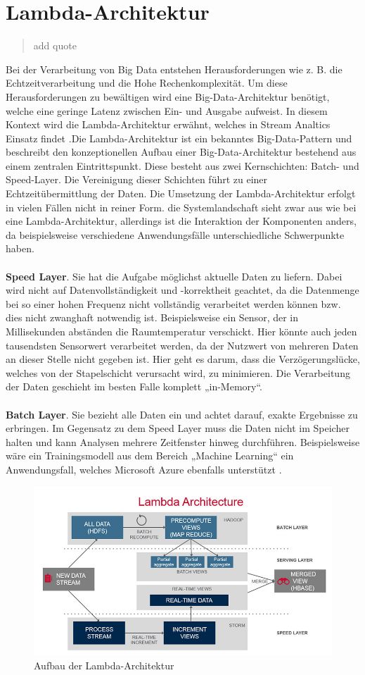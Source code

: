 \section{Lambda-Architektur}

\begin{quote}\glqq add quote \grqq~\cite[S.14]{Roth.2016}\end{quote} 
Bei der Verarbeitung von Big Data entstehen Herausforderungen wie z. B. die Echtzeitverarbeitung und die Hohe Rechenkomplexität. Um diese Herausforderungen zu bewältigen wird eine Big-Data-Architektur benötigt, welche eine geringe Latenz zwischen Ein- und Ausgabe aufweist. In diesem Kontext wird die Lambda-Architektur erwähnt, welches in Stream Analtics Einsatz findet \cite{Familiar.2017}.Die  Lambda-Architektur ist ein bekanntes Big-Data-Pattern und beschreibt den  konzeptionellen  Aufbau  einer  Big-Data-Architektur bestehend  aus  einem  zentralen  Eintrittspunkt. Diese besteht aus zwei Kernschichten: Batch- und Speed-Layer. Die Vereinigung dieser Schichten führt zu einer Echtzeitübermittlung der Daten. Die Umsetzung der Lambda-Architektur erfolgt in vielen Fällen nicht in reiner Form. die Systemlandschaft sieht zwar aus wie bei eine Lambda-Architektur, allerdings ist die Interaktion der Komponenten anders, da beispielsweise verschiedene Anwendungsfälle unterschiedliche Schwerpunkte haben.  \\ \\ \textbf{Speed Layer}. Sie hat die Aufgabe möglichst aktuelle Daten zu liefern. Dabei wird nicht auf Datenvollständigkeit und -korrektheit geachtet, da die Datenmenge bei so einer hohen Frequenz nicht vollständig verarbeitet werden können bzw. dies nicht zwanghaft notwendig ist. Beispielsweise ein Sensor, der in Millisekunden abständen die Raumtemperatur verschickt. Hier könnte auch jeden tausendsten Sensorwert verarbeitet werden, da der Nutzwert von mehreren Daten an dieser Stelle nicht gegeben ist. Hier geht es darum, dass die Verzögerungslücke, welches von der Stapelschicht verursacht wird, zu minimieren. Die Verarbeitung der Daten geschieht im besten Falle komplett „in-Memory“.\\ \\ \textbf{Batch Layer}. Sie bezieht alle Daten ein und achtet darauf, exakte Ergebnisse zu erbringen. Im Gegensatz zu dem Speed Layer muss die Daten nicht im Speicher halten und kann Analysen mehrere Zeitfenster hinweg durchführen. Beispielsweise wäre ein Trainingsmodell aus dem Bereich „Machine Learning“ ein Anwendungsfall, welches Microsoft Azure ebenfalls unterstützt \cite{Berle.2017}. 

\begin{figure}[h!]
	\centering
	\includegraphics[width=1.0\linewidth]{images/lambda-architecture}
	\caption{Aufbau der Lambda-Architektur} %
	\label{fig:cnn_structure}
\end{figure}